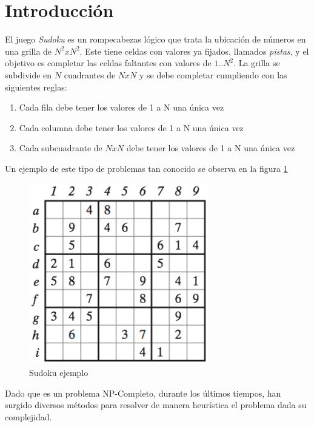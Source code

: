 \documentclass[a4paper,spanish]{article}
\begin{document}

\tableofcontents
\pagebreak


\section{Introducción}
\label{sec:intro}

El juego \emph{Sudoku} es un rompecabezas lógico que trata la ubicación de
números en una grilla de $N^2 x N^2$. Este tiene celdas con valores ya fijados,
llamados \textit{pistas}, y el objetivo es completar las celdas
faltantes con valores de $1..N^2$. La grilla se subdivide en $N$ cuadrantes de
$N x N$  y se debe completar cumpliendo con las siguientes reglas:

\begin{enumerate}
    \label{enum:principios}

    \item Cada fila debe tener los valores de 1 a N una única vez
    \item Cada columna debe tener los valores de 1 a N una única vez
    \item Cada subcuadrante de $NxN$ debe tener los valores de 1 a N una única vez
\end{enumerate}

Un ejemplo de este tipo de problemas tan conocido se observa en la figura \ref{img:sudoku}


\begin{figure}[H]
	\centering
	\includegraphics[scale=0.6]{./img/sudoku.png}
	\caption{Sudoku ejemplo}
	\label{img:sudoku}
\end{figure}

Dado que es un problema NP-Completo, durante los últimos tiempos, han surgido
diversos métodos para resolver de manera heurística el problema dada su complejidad.
\end{document}
